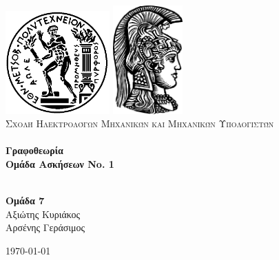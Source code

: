 \begin{titlepage}
\begin{center}

\includegraphics[width=0.3\textwidth]{./pyrforos.png}
\includegraphics[width=0.2\textwidth]{./uoa.png}\\[1cm]

\textsc{\LARGE Σχολή Ηλεκτρολόγων Μηχανικών και Μηχανικών Υπολογιστών}\\[1.5cm]

\HRule \\[0.4cm]
{\huge \bfseries Γραφοθεωρία\\
\LARGE Ομάδα Ασκήσεων No. 1}\\[0.4cm]

\HRule \\[1.5cm]

\begin{center}
\textbf{Ομάδα 7}\\
Αξιώτης Κυριάκος\\
Αρσένης Γεράσιμος
\end{center}

\vfill

{\large \today}
\end{center}

\end{titlepage}
